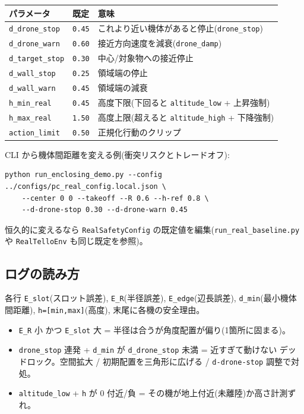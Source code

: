 \documentclass[11pt,a4paper]{ltjsarticle}
\newcommand{\code}[1]{\texttt{\small #1}}
\begin{document}
\begin{longtable}{@{}p{3.6cm}p{1.8cm}p{9.6cm}@{}}
\toprule
\textbf{パラメータ} & \textbf{既定} & \textbf{意味} \\
\midrule
\endhead
\code{d\_drone\_stop} & \code{0.45} & これより近い機体があると停止(\code{drone\_stop})\\
\code{d\_drone\_warn} & \code{0.60} & 接近方向速度を減衰(\code{drone\_damp})\\
\code{d\_target\_stop} & \code{0.30} & 中心/対象物への接近停止 \\
\code{d\_wall\_stop} & \code{0.25} & 領域端の停止 \\
\code{d\_wall\_warn} & \code{0.45} & 領域端の減衰 \\
\code{h\_min\_real} & \code{0.45} & 高度下限(下回ると \code{altitude\_low} + 上昇強制)\\
\code{h\_max\_real} & \code{1.50} & 高度上限(超えると \code{altitude\_high} + 下降強制)\\
\code{action\_limit} & \code{0.50} & 正規化行動のクリップ \\
\bottomrule
\end{longtable}

CLI から機体間距離を変える例(衝突リスクとトレードオフ):
\begin{lstlisting}
python run_enclosing_demo.py --config ../configs/pc_real_config.local.json \
    --center 0 0 --takeoff --R 0.6 --h-ref 0.8 \
    --d-drone-stop 0.30 --d-drone-warn 0.45
\end{lstlisting}
恒久的に変えるなら \code{RealSafetyConfig} の既定値を編集(\code{run\_real\_baseline.py} や
\code{RealTelloEnv} も同じ既定を参照)。

\subsection{ログの読み方}
各行 \code{E\_slot}(スロット誤差), \code{E\_R}(半径誤差), \code{E\_edge}(辺長誤差),
\code{d\_min}(最小機体間距離), \code{h=[min,max]}(高度), 末尾に各機の安全理由。
\begin{itemize}[leftmargin=1.4em]
  \item \code{E\_R} 小 かつ \code{E\_slot} 大 = 半径は合うが角度配置が偏り(1箇所に固まる)。
  \item \code{drone\_stop} 連発 + \code{d\_min} が \code{d\_drone\_stop} 未満 = 近すぎて動けない
        デッドロック。空間拡大 / 初期配置を三角形に広げる / \code{d-drone-stop} 調整で対処。
  \item \code{altitude\_low} + \code{h} が 0 付近/負 = その機が地上付近(未離陸)か高さ計測ずれ。
\end{itemize}
\end{document}
